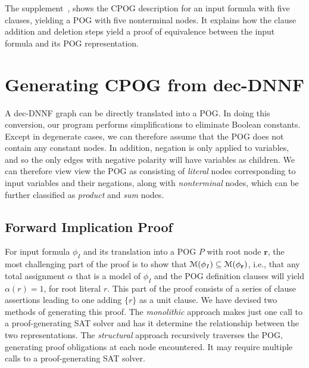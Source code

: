 \documentclass[letterpaper,USenglish,cleveref, autoref, thm-restate]{lipics-v2021}
\newcommand{\assign}{\alpha}
\newcommand{\modelset}{{\cal M}}
\newcommand{\inputformula}{\phi_I}
\newcommand{\makenode}[1]{\mathbf{#1}}
\newcommand{\noder}{\makenode{r}}
\newcommand{\progname}[1]{\textsc{#1}}
\newcommand{\dfour}{\progname{D4}}
\begin{document}
The supplement~\cite{bryant:sat:2023:supplement},
shows the CPOG description for
an input formula with five clauses, yielding a POG with five
nonterminal nodes.  It explains how the clause addition and deletion
steps yield a proof of equivalence between the input formula and its POG
representation.

\section{Generating CPOG from dec-DNNF}
\label{section:generating:cpog}

A dec-DNNF
graph can be directly translated  into a POG.
In doing this conversion,
our program performs simplifications to
eliminate Boolean constants.
Except in degenerate cases,
we can therefore assume
that the POG does not contain any constant nodes.
In addition, negation is only
applied to variables, and so the only edges with negative polarity will have variables as children.
We can therefore view
view the POG as consisting
of \emph{literal} nodes corresponding to input variables and their negations, along with
\emph{nonterminal} nodes, which can be further classified as \emph{product} and \emph{sum} nodes.

\subsection{Forward Implication Proof}

For input formula $\inputformula$ and its translation into a POG $P$
with root node $\noder$, the most challenging part of the proof is to
show that $\modelset(\inputformula) \subseteq \modelset(\phi_\noder)$, i.e.,
that any total assignment $\assign$ that is a model of $\inputformula$
and the POG definition clauses
will yield $\assign(r) = 1$, for root literal $r$.  This part of the
proof consists of a series of clause assertions leading to one adding
$\{r\}$ as a unit clause.  We have devised two methods of generating this
proof.  The \emph{monolithic} approach makes just one call to a
proof-generating SAT solver and has it determine the relationship
between the two representations.  The \emph{structural} approach
recursively traverses the POG, generating proof obligations at each
node encountered.  It may require multiple calls to a proof-generating SAT
solver.
\end{document}
